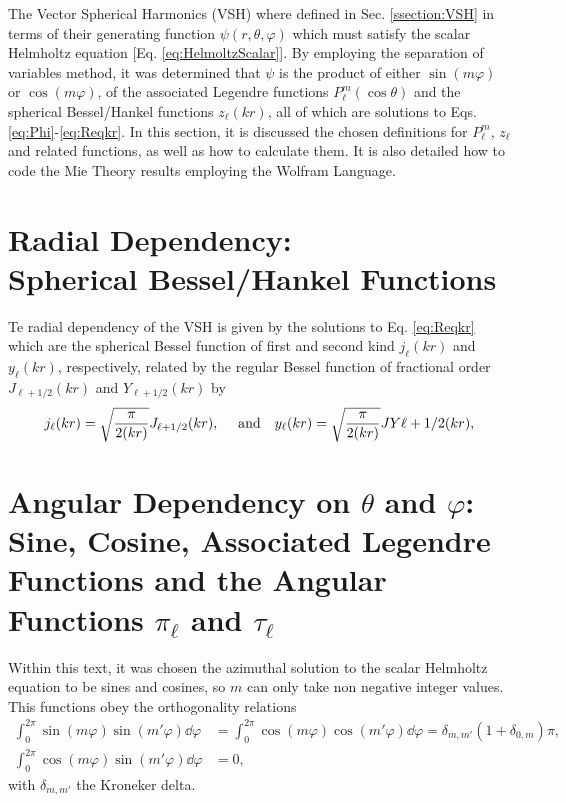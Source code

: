 
The Vector Spherical Harmonics (VSH) where defined in Sec. \ref{ssection:VSH} in terms of their generating function $\psi(r,\theta,\varphi)$ which must satisfy the scalar Helmholtz equation [Eq.  \eqref{eq:HelmoltzScalar}]. By employing the separation of variables method,  it was determined that $\psi$ is the product of either $\sin(m\varphi)$ or $\cos(m\varphi)$, of the associated Legendre functions $P_\ell^m(\cos\theta)$ and the spherical Bessel/Hankel functions $z_\ell(kr)$, all of which are solutions to Eqs. \eqref{eq:Phi}-\eqref{eq:Reqkr}. In this section, it is discussed the chosen definitions for $P_\ell^m$, $z_\ell$ and related functions, as well as how to calculate them. It is also detailed how to code the Mie Theory results employing the Wolfram Language.

\section*{Radial Dependency:\\ Spherical Bessel/Hankel Functions}

Te radial dependency of the VSH is given by the solutions to Eq. \eqref{eq:Reqkr} which are the spherical Bessel function of first and second kind $j_\ell(kr)$ and $y_\ell(kr)$, respectively, related by the regular Bessel function of fractional order $J_{\ell+1/2}(kr)$ and  $Y_{\ell+1/2}(kr)$ by
%
\begin{align}
j_\ell(kr) = \sqrt{\frac{\pi}{2(kr)}}J_{\ell+1/2}(kr),\qqtext{ and} 
y_\ell(kr) = \sqrt{\frac{\pi}{2(kr)}}JY{\ell+1/2}(kr),
\end{align}
%

\section*{Angular Dependency on $\theta$ and $\varphi$:\\ Sine, Cosine, Associated Legendre Functions and the Angular Functions $\pi_\ell$ and $\tau_\ell$}

Within this text, it was chosen the azimuthal solution to the scalar Helmholtz equation to be sines and cosines, so $m$ can only take non negative integer values. This functions obey the orthogonality relations
%
\begin{align}
\int_0^{2\pi} \sin(m\varphi)\sin(m'\varphi) \dd{\varphi} &=
\int_0^{2\pi} \cos(m\varphi)\cos(m'\varphi) \dd{\varphi} =\delta_{m,m'}( 1+ \delta_{0,m}) \pi,
\label{eq:SinCos}
\\
\int_0^{2\pi} \cos(m\varphi)\sin(m'\varphi) \dd{\varphi} &=0,
\end{align}
%
with $\delta_{m,m'}$ the Kroneker delta.

